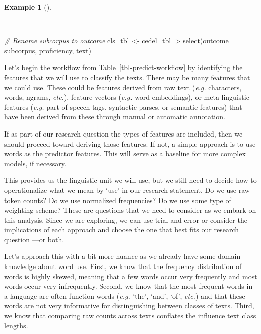 \documentclass[
  letterpaper,
  krantz1]{latex/krantz-mod}
\newenvironment{Shaded}{\begin{snugshade}}{\end{snugshade}}
\newcommand{\AttributeTok}[1]{\textcolor[rgb]{0.00,0.00,0.00}{#1}}
\newcommand{\CommentTok}[1]{\textcolor[rgb]{0.00,0.00,0.00}{\textit{#1}}}
\newcommand{\FunctionTok}[1]{\textcolor[rgb]{0.00,0.00,0.00}{#1}}
\newcommand{\NormalTok}[1]{\textcolor[rgb]{0.00,0.00,0.00}{#1}}
\newcommand{\OtherTok}[1]{\textcolor[rgb]{0.00,0.00,0.00}{#1}}
\newcommand{\SpecialCharTok}[1]{\textcolor[rgb]{0.00,0.00,0.00}{#1}}
\theoremstyle{definition}
\theoremstyle{definition}
\newtheorem{example}{Example}[chapter]
\theoremstyle{remark}
\begin{document}
\begin{example}[]\protect\hypertarget{exm-predict-class-data}{}\label{exm-predict-class-data}

~

\begin{Shaded}
\begin{Highlighting}[numbers=left,,]
\CommentTok{\# Rename subcorpus to outcome}
\NormalTok{cls\_tbl }\OtherTok{\textless{}{-}}
\NormalTok{  cedel\_tbl }\SpecialCharTok{|\textgreater{}}
  \FunctionTok{select}\NormalTok{(}\AttributeTok{outcome =}\NormalTok{ subcorpus, proficiency, text)}
\end{Highlighting}
\end{Shaded}

\end{example}

Let's begin the workflow from Table~\ref{tbl-predict-workflow} by
identifying the features that we will use to classify the texts. There
may be many features that we could use. These could be features derived
from raw text (\emph{e.g.} characters, words, ngrams, \emph{etc.}),
feature vectors (\emph{e.g.} word embeddings), or meta-linguistic
features (\emph{e.g.} part-of-speech tags, syntactic parses, or semantic
features) that have been derived from these through manual or automatic
annotation.

If as part of our research question the types
of features are included, then we should proceed toward deriving those
features. If not, a simple approach is to use words as the predictor
features. This will serve as a baseline for
more complex models, if necessary.

This provides us the linguistic unit we will use, but we still need to
decide how to operationalize what we mean by `use' in our research
statement. Do we use raw token counts? Do we use normalized frequencies?
Do we use some type of weighting scheme? These are questions that we
need to consider as we embark on this analysis. Since we are exploring,
we can use trial-and-error or consider the implications of each approach
and choose the one that best fits our research question ---or both.

Let's approach this with a bit more nuance as we already have some
domain knowledge about word use. First, we know that the frequency
distribution of words is highly skewed,
meaning that a few words occur very frequently and most words occur very
infrequently. Second, we know that the most frequent words in a language
are often function words (\emph{e.g.} `the',
`and', `of', \emph{etc.}) and that these words are not very informative
for distinguishing between classes of texts. Third, we know that
comparing raw counts across texts conflates the influence text class
lengths.
\end{document}
